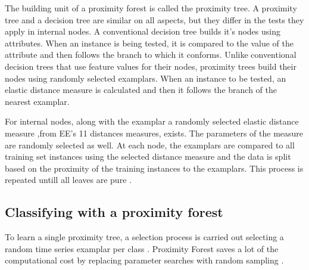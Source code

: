 The building unit of a proximity forest is called the proximity tree. A proximity tree and a decision tree are similar on all aspects,
but they differ in the tests they apply in internal nodes.
A conventional decision tree builds it's nodes using attributes. When an instance is being tested, it is compared to the value of the attribute
and then follows the branch to which it conforms.\newline
Unlike conventional decision trees that use feature values for their nodes, proximity trees build their nodes using randomly selected examplars.
When an instance to be tested, an elastic distance measure is calculated and then it follows the branch of the nearest examplar.

For internal nodes, along with the examplar a randomly selected elastic distance measure ,from EE's 11 distances measures, exists. The parameters of the measure are randomly selected as well.
At each node, the examplars are compared to all training set instances using the selected distance measure and the data is split based on the proximity
of the training instances to the examplars. This process is repeated untill all leaves are pure \cite{lucas2019proximity}.

\subsection{Classifying with a proximity forest}

To learn a single proximity tree, a selection process is carried out selecting a random time series examplar per class \cite{lucas2019proximity}.
Proximity Forest saves a lot of the computational cost by replacing parameter searches with random sampling \cite{fawaz2020inceptiontime,fawaz2019deepreview}.\newline